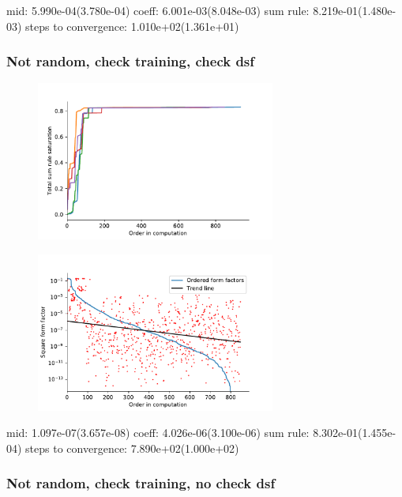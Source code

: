 \documentclass[11pt, a4paper]{report} %
\begin{document}
mid: 5.990e-04(3.780e-04)
coeff: 6.001e-03(8.048e-03)
sum rule: 8.219e-01(1.480e-03)
steps to convergence: 1.010e+02(1.361e+01)

\subsubsection{Not random, check training, check dsf}

\begin{figure}[tb!]
  \centering
  \includegraphics[width=0.7\textwidth]{saturation_history_nn_check_train_check_eval.pdf}
\end{figure}

\begin{figure}[tb!]
  \centering
  \includegraphics[width=0.7\textwidth]{ffsizes_nn_check_train_check_eval.pdf}
\end{figure}


mid: 1.097e-07(3.657e-08)
coeff: 4.026e-06(3.100e-06)
sum rule: 8.302e-01(1.455e-04)
steps to convergence: 7.890e+02(1.000e+02)

\subsubsection{Not random, check training, no check dsf}
\end{document}
